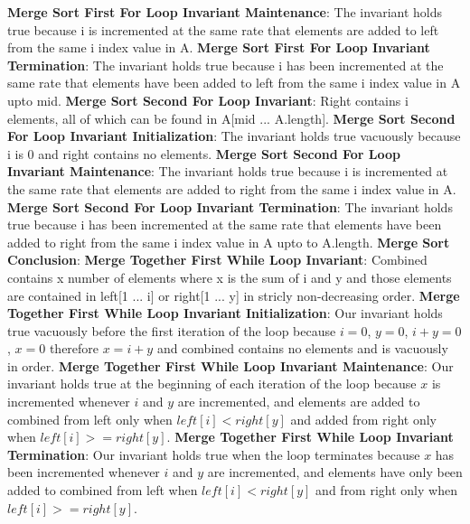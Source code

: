 \documentclass[onecolumn, 12pt, article]{IEEEtran}
\numberwithin{case}{problem}
\numberwithin{condition}{problem}
\numberwithin{condition}{subsection}
\numberwithin{definition}{section}
\theoremstyle{remark}
\numberwithin{question}{problem}
\theoremstyle{plain}
\numberwithin{answer}{problem}
\numberwithin{solution}{section}
\numberwithin{equation}{section}%
\begin{document}
\textbf{Merge Sort First For Loop Invariant Maintenance}: The invariant holds true because i is incremented at the same rate that elements are added to left from the same i index value in A.
\newline
\textbf{Merge Sort First For Loop Invariant Termination}: The invariant holds true because i has been incremented at the same rate that elements have been added to left from the same i index value in A upto mid.
\newline
\newline
\textbf{Merge Sort Second For Loop Invariant}: Right contains i elements, all of which can be found in A[mid ... A.length].
\newline
\textbf{Merge Sort Second For Loop Invariant Initialization}: The invariant holds true vacuously because i is 0 and right contains no elements.
\newline
\textbf{Merge Sort Second For Loop Invariant Maintenance}: The invariant holds true because i is incremented at the same rate that elements are added to right from the same i index value in A.
\newline
\textbf{Merge Sort Second For Loop Invariant Termination}: The invariant holds true because i has been incremented at the same rate that elements have been added to right from the same i index value in A upto to A.length.
\newline
\newline
\textbf{Merge Sort Conclusion}: %
\newline
\newline
\textbf{Merge Together First While Loop Invariant}: Combined contains x number of elements where x is the sum of i and y and those elements are contained in left[1 ... i] or right[1 ... y] in stricly non-decreasing order.
\newline
\textbf{Merge Together First While Loop Invariant Initialization}: Our invariant holds true vacuously before the first iteration of the loop because $i = 0$, $y = 0$, $i + y = 0$, $x = 0$ therefore $x = i + y$ and combined contains no elements and is vacuously in order.
\newline
\textbf{Merge Together First While Loop Invariant Maintenance}: Our invariant holds true at the beginning of each iteration of the loop because $x$ is incremented whenever $i$ and $y$ are incremented, and elements are added to combined from left only when $left[i] < right[y]$ and added from right only when $left[i] >= right[y]$.
\newline
\textbf{Merge Together First While Loop Invariant Termination}: Our invariant holds true when the loop terminates because $x$ has been incremented whenever $i$ and $y$ are incremented, and elements have only been added to combined from left when $left[i] < right[y]$ and from right only when $left[i] >= right[y]$.
\end{document}
